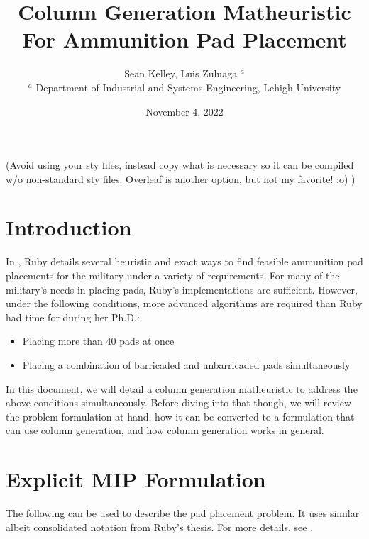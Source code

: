 \documentclass[10pt]{article}
\newcommand{\luiscomm}[1]{{\color{magenta} #1}}
\begin{document}
	\title{Column Generation Matheuristic For Ammunition Pad Placement}
	\author{Sean Kelley, Luis Zuluaga $^a$ \\
		$^a$ Department of Industrial and Systems Engineering, Lehigh University}
	\date{November 4, 2022}
	\maketitle

\luiscomm{(Avoid using your sty files, instead	 copy what is necessary so it can be compiled w/o non-standard sty files. Overleaf is another option, but not my favorite! :o) )}
	\section{Introduction}
	In \cite{ruby}, Ruby details several heuristic and exact ways to find feasible ammunition pad placements for the military under a variety of requirements. For many of the military's needs in placing pads, Ruby's implementations are sufficient. However, under the following conditions, more advanced algorithms are required than Ruby had time for during her Ph.D.:
	\begin{itemize}
		\item Placing more than 40 pads at once
		\item Placing a combination of barricaded and unbarricaded pads simultaneously
	\end{itemize}
	In this document, we will detail a column generation matheuristic to address the above conditions simultaneously. Before diving into that though, we will review the problem formulation at hand, how it can be converted to a formulation that can use column generation, and how column generation works in general.
	
	\section{Explicit MIP Formulation}
	The following can be used to describe the pad placement problem. It uses similar albeit consolidated notation from Ruby's thesis. For more details, see \cite{ruby}.
\end{document}
